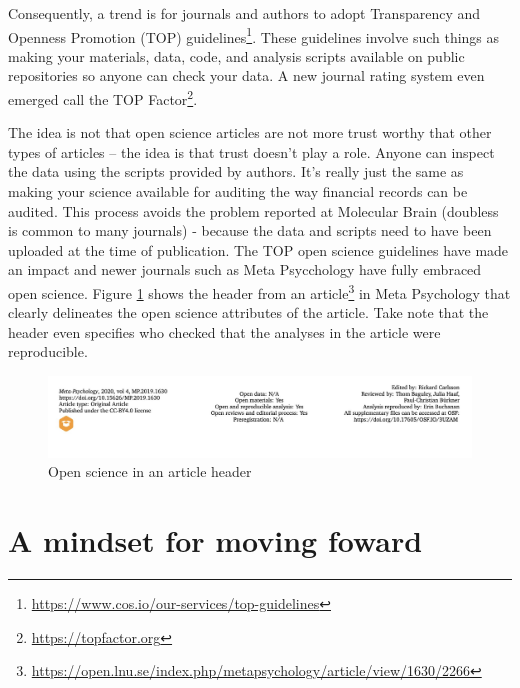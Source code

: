 \documentclass[
]{krantz}
\renewcommand{\href}[2]{#2\footnote{\url{#1}}}
\begin{document}
Consequently, a trend is for journals and authors to adopt Transparency and Openness Promotion (TOP) \href{https://www.cos.io/our-services/top-guidelines}{guidelines}. These guidelines involve such things as making your materials, data, code, and analysis scripts available on public repositories so anyone can check your data. A new journal rating system even emerged call the \href{https://topfactor.org}{TOP Factor}.

The idea is not that open science articles are not more trust worthy that other types of articles -- the idea is that trust doesn't play a role. Anyone can inspect the data using the scripts provided by authors. It's really just the same as making your science available for auditing the way financial records can be audited. This process avoids the problem reported at Molecular Brain (doubless is common to many journals) - because the data and scripts need to have been uploaded at the time of publication. The TOP open science guidelines have made an impact and newer journals such as Meta Psycchology have fully embraced open science. Figure \ref{fig:metapsychology} shows the header from an \href{https://open.lnu.se/index.php/metapsychology/article/view/1630/2266}{article} in Meta Psychology that clearly delineates the open science attributes of the article. Take note that the header even specifies who checked that the analyses in the article were reproducible.

\begin{figure}
\includegraphics[width=0.85\linewidth]{ch_score_items/images/screenshot_metapsychology} \caption{Open science in an article header}\label{fig:metapsychology}
\end{figure}

\hypertarget{a-mindset-for-moving-foward}{%
\section{A mindset for moving foward}\label{a-mindset-for-moving-foward}}
\end{document}
